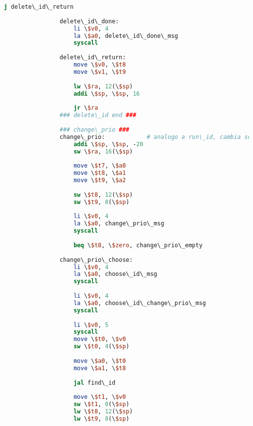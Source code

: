 \begin{center}
\begin{lstlisting}[language=mips, gobble=14, stepnumber=1]
                    j delete\_id\_return
                    
                delete\_id\_done:
                    li \$v0, 4
                    la \$a0, delete\_id\_done\_msg
                    syscall
                
                delete\_id\_return:
                    move \$v0, \$t8
                    move \$v1, \$t9
                    
                    lw \$ra, 12(\$sp)
                    addi \$sp, \$sp, 16
                    
                    jr \$ra
                ### delete\_id end ###
                    
                ### change\_prio ###
                change\_prio:            # analogo a run\_id, cambia soltanto la parte centrale
                    addi \$sp, \$sp, -20
                    sw \$ra, 16(\$sp)
                
                    move \$t7, \$a0
                    move \$t8, \$a1
                    move \$t9, \$a2
                    
                    sw \$t8, 12(\$sp)
                    sw \$t9, 8(\$sp)
                
                    li \$v0, 4
                    la \$a0, change\_prio\_msg
                    syscall
                    
                    beq \$t8, \$zero, change\_prio\_empty
                    
                change\_prio\_choose:
                    li \$v0, 4
                    la \$a0, choose\_id\_msg
                    syscall
                    
                    li \$v0, 4
                    la \$a0, choose\_id\_change\_prio\_msg
                    syscall
                    
                    li \$v0, 5
                    syscall
                    move \$t0, \$v0
                    sw \$t0, 4(\$sp)
                    
                    move \$a0, \$t0
                    move \$a1, \$t8
                    
                    jal find\_id
                    
                    move \$t1, \$v0
                    sw \$t1, 0(\$sp)
                    lw \$t8, 12(\$sp)
                    lw \$t9, 8(\$sp)
                    

\end{lstlisting}
\end{center}
